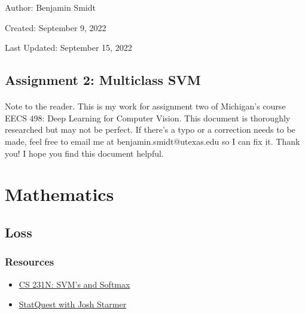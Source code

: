 \documentclass[12pt]{article}
\begin{document}
\noindent Author: Benjamin Smidt

\noindent Created: September 9, 2022

\noindent Last Updated: September 15, 2022
\begin{center}
\section*{Assignment 2: Multiclass SVM}
\end{center}

\paragraph{} Note to the reader. This is my work for assignment two of Michigan's course
EECS 498: Deep Learning for Computer Vision. This document is thoroughly researched but
may not be perfect. If there's a typo or a correction needs to be made, feel free to 
email me at benjamin.smidt@utexas.edu so I can fix it. Thank you! I hope you find this 
document helpful.

\tableofcontents{}

\newpage
\section{Mathematics}
\subsection{Loss}

\subsubsection*{Resources}
\begin{itemize}
    \item \href{https://cs231n.github.io/linear-classify/#svm-vs-softmax}{CS 231N: SVM's and Softmax }
    \item \href{https://www.youtube.com/watch?v=efR1C6CvhmE}{StatQuest with Josh Starmer}
\end{itemize}
\end{document}
